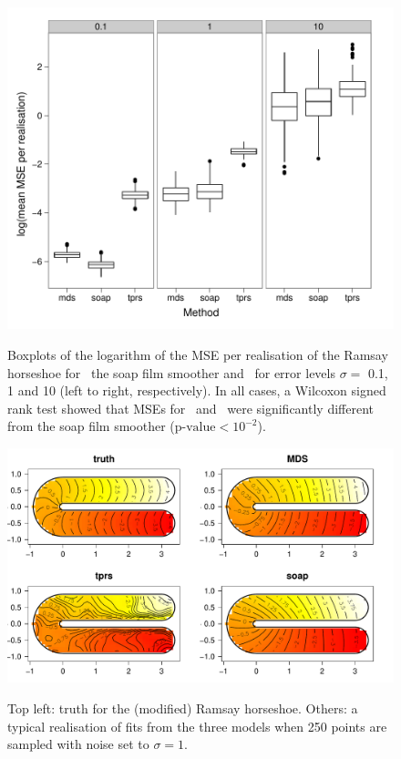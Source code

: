 \begin{figure}
\centering
\includegraphics[width=6in]{mds/figs/mds-ramsay-boxplot.pdf} \\
\caption{Boxplots of the logarithm of the MSE per realisation of the Ramsay horseshoe for \mdsap\, the soap film smoother and \tprs\ for error levels $\sigma=$ 0.1, 1 and 10 (left to right, respectively). In all cases, a Wilcoxon signed rank test showed that MSEs for \mdsap\ and \tprs\ were significantly different from the soap film smoother ($\text{p-value} < 10^{-2}$).}
\label{mds-ramsay-boxplot}
\end{figure}

\begin{figure}
\centering
\includegraphics[width=6in]{mds/figs/ramsay-fit-1.pdf} \\
\caption{Top left: truth for the (modified) Ramsay horseshoe. Others: a typical realisation of fits from the three models when 250 points are sampled with noise set to $\sigma=1$.}
\label{mds-ramsay-fit-1}
\end{figure}


